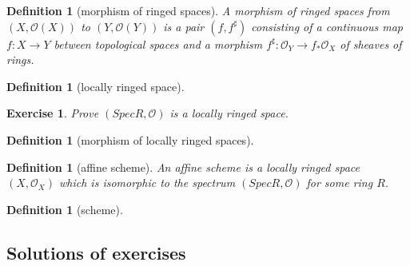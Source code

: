 \documentclass[12pt]{article}
\newtheorem{definition}[proposition]{Definition}
\newtheorem{ex}[proposition]{Exercise}
\begin{document}
\begin{definition}[morphism of ringed spaces]
	A morphism of ringed spaces from $(X, \mathscr{O}(X))$ to $(Y, \mathscr{O}(Y))$ is a pair $(f, f^{\sharp})$ consisting of a continuous map $f: X \rightarrow Y$ between topological spaces and a morphism $f^{\sharp}: \mathscr{O}_Y \rightarrow f_{*} \mathscr{O}_X$ of sheaves of rings.   
\end{definition}

\begin{definition}[locally ringed space]
		
\end{definition}

\begin{ex}
	Prove $(Spec R, \mathscr{O})$ is a locally ringed space.
\end{ex}	

\begin{definition}[morphism of locally ringed spaces]
	
\end{definition}	

\begin{definition}[affine scheme]
	An affine scheme is a locally ringed space $(X, \mathscr{O}_X)$ which is isomorphic to the spectrum $(Spec R, \mathscr{O})$ for some ring $R$. 
\end{definition}

\begin{definition}[scheme]
	
\end{definition}	
																	

\begin{appendices}
	\addappheadtotoc

\section{Solutions of exercises}

	

	
\end{appendices}						

		
\end{document}
